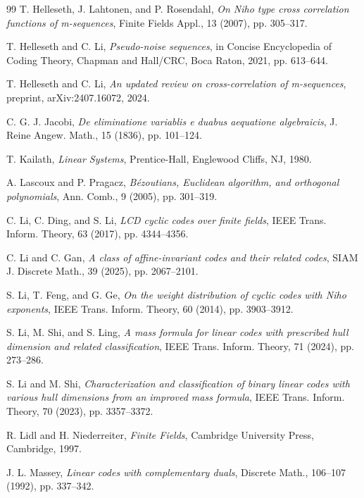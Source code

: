 \documentclass[hidelinks,onefignum,onetabnum]{siamart251216}
\theoremstyle{definition}
\theoremstyle{remark}
\begin{document}
\begin{thebibliography}{99}
	T. Helleseth, J. Lahtonen, and P. Rosendahl, \emph{On Niho type cross correlation functions of m-sequences}, Finite Fields Appl., 13 (2007), pp. 305--317.
	
	T. Helleseth and C. Li, \emph{Pseudo-noise sequences}, in Concise Encyclopedia of Coding Theory, Chapman and Hall/CRC, Boca Raton, 2021, pp. 613--644.
	
	T. Helleseth and C. Li, \emph{An updated review on cross-correlation of m-sequences}, preprint, arXiv:2407.16072, 2024.
	
	C. G. J. Jacobi, \emph{De eliminatione variablis e duabus aequatione algebraicis}, J. Reine Angew. Math., 15 (1836), pp. 101--124.
	
	T. Kailath, \emph{Linear Systems}, Prentice-Hall, Englewood Cliffs, NJ, 1980.
	
	A. Lascoux and P. Pragacz, \emph{B{\'e}zoutians, Euclidean algorithm, and orthogonal polynomials}, Ann. Comb., 9 (2005), pp. 301--319.
	
	C. Li, C. Ding, and S. Li, \emph{LCD cyclic codes over finite fields}, IEEE Trans. Inform. Theory, 63 (2017), pp. 4344--4356.
	
	C. Li and C. Gan, \emph{A class of affine-invariant codes and their related codes}, SIAM J. Discrete Math., 39 (2025), pp. 2067--2101.
	
	S. Li, T. Feng, and G. Ge, \emph{On the weight distribution of cyclic codes with Niho exponents}, IEEE Trans. Inform. Theory, 60 (2014), pp. 3903--3912.
	
	S. Li, M. Shi, and S. Ling, \emph{A mass formula for linear codes with prescribed hull dimension and related classification}, IEEE Trans. Inform. Theory, 71 (2024), pp. 273--286.
	
	S. Li and M. Shi, \emph{Characterization and classification of binary linear codes with various hull dimensions from an improved mass formula}, IEEE Trans. Inform. Theory, 70 (2023), pp. 3357--3372.
	
	R. Lidl and H. Niederreiter, \emph{Finite Fields}, Cambridge University Press, Cambridge, 1997.
	
	J. L. Massey, \emph{Linear codes with complementary duals}, Discrete Math., 106--107 (1992), pp. 337--342.
	

\end{thebibliography}
\end{document}
